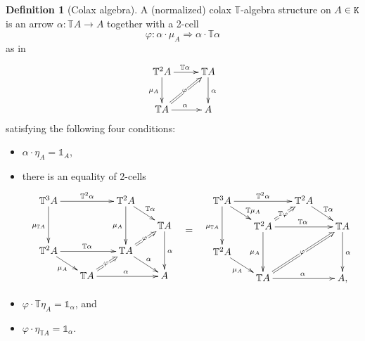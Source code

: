 \documentclass[12pt,leqno]{amsart}
\theoremstyle{definition}
\newtheorem{definition}[theorem]{Definition}
\def\T{\mathbb{T}}
\newcommand{\C}{{\tt C}}
\newcommand{\K}{{\tt K}}
\newcommand{\uu}{\mathbb{1}}
\newcommand{\4}{\texttt{4}}
\renewcommand{\phi}{\varphi}
\begin{document}
\begin{definition}[Colax algebra]
\label{definition:colax_alg}
A (normalized) colax $\T$-algebra structure on $A\in \K$ is
an arrow
$\alpha\colon \T A\to A$ together with a 2-cell
\[\phi\colon \alpha\cdot \mu_A \Longrightarrow \alpha \cdot\T \alpha\]
as in
\[
\xymatrix@R=2.5em@C=2.5em{
\T^2 A \ar[r]^{\T \alpha} \ar[d]_{\mu_A} 
& \T A \ar[d]^{\alpha} \ar@{<=}[dl]|{\phi\rule{.1em}{0pt}}
\\
\T A \ar[r]^{\alpha} & A
}
\]
satisfying the following four conditions:
\begin{itemize}[topsep=0pt, partopsep=0pt, itemsep=0pt, itemindent=-1em]
\item[(i)]
$\alpha \cdot \eta_A=\uu_A$,
\item[(ii)] 
there is an equality of 2-cells
\[
\xymatrix@R=1.2em@C=1.7em{
\T^3 A \ar[rr]^{\T^2 \alpha}\ar[dd]_{\mu_{\T A}} && \T^2 A \ar[rd]^{\T \alpha} \ar[dd]_{\mu_A}
\\
&&& \T A \ar[dd]^{\alpha} \ar@{<=}[ld]|{\phi\rule{.1em}{0pt}}
\\
\T^2 A  \ar[rr]^{\T \alpha} \ar[rd]_{\mu_A} && \T A
\ar@{<=}[ld]|{\phi\rule{.1em}{0pt}}
\ar[dr]^{\alpha}
\\
&\T A \ar[rr]^{\alpha} && A
}
\hskip 1em
\raisebox{-3em}{$=$} \hskip 1em
\xymatrix@R=1.2em@C=1.7em{
\T^3 A \ar[rr]^{\T^2 {\alpha}}\ar[dd]_{\mu_{\T A}} \ar[rd]^(.6){\T\mu_A}   && 
\T^2 A \ar[rd]^{\T {\alpha}} \ar@{<=}[ld]|(.5){\T{\phi\rule{.1em}{0pt}}}
\\
&\T^2 A  \ar[rr]^{\T {\alpha}}   \ar[dd]_{\mu_A}&& \T A \ar[dd]^{\alpha} 
\ar@{<=}[lldd]|{\phi\rule{.1em}{0pt}}
\\
\T^2 A \ar[rd]_{\mu_A} &&
\\
&\T A \ar[rr]^{\alpha} && A,
}
\]
\item[(iii)]
$\phi \cdot \T\eta_A=\uu_{\alpha}$, and
\item[(iv)]
$\phi \cdot \eta_{\T A}=\uu_{\alpha}$.
\end{itemize}
\end{definition}
\end{document}
